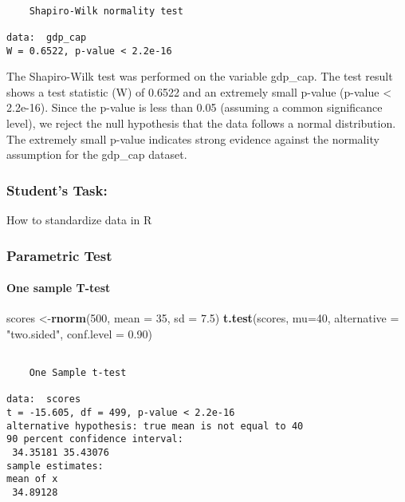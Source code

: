 \documentclass[
]{article}
\newenvironment{Shaded}{\begin{snugshade}}{\end{snugshade}}
\newcommand{\AttributeTok}[1]{\textcolor[rgb]{0.13,0.29,0.53}{#1}}
\newcommand{\DecValTok}[1]{\textcolor[rgb]{0.00,0.00,0.81}{#1}}
\newcommand{\FloatTok}[1]{\textcolor[rgb]{0.00,0.00,0.81}{#1}}
\newcommand{\FunctionTok}[1]{\textcolor[rgb]{0.13,0.29,0.53}{\textbf{#1}}}
\newcommand{\NormalTok}[1]{#1}
\newcommand{\OtherTok}[1]{\textcolor[rgb]{0.56,0.35,0.01}{#1}}
\newcommand{\StringTok}[1]{\textcolor[rgb]{0.31,0.60,0.02}{#1}}
\begin{document}
\begin{verbatim}

    Shapiro-Wilk normality test

data:  gdp_cap
W = 0.6522, p-value < 2.2e-16
\end{verbatim}

The Shapiro-Wilk test was performed on the variable gdp\_cap. The test
result shows a test statistic (W) of 0.6522 and an extremely small
p-value (p-value \textless{} 2.2e-16). Since the p-value is less than
0.05 (assuming a common significance level), we reject the null
hypothesis that the data follows a normal distribution. The extremely
small p-value indicates strong evidence against the normality assumption
for the gdp\_cap dataset.

\hypertarget{students-task}{%
\subsubsection{Student's Task:}\label{students-task}}

How to standardize data in R

\hypertarget{parametric-test}{%
\subsubsection{Parametric Test}\label{parametric-test}}

\hypertarget{one-sample-t-test}{%
\paragraph{One sample T-test}\label{one-sample-t-test}}

\begin{Shaded}
\begin{Highlighting}[]
\NormalTok{scores }\OtherTok{\textless{}{-}}\FunctionTok{rnorm}\NormalTok{(}\DecValTok{500}\NormalTok{, }\AttributeTok{mean =} \DecValTok{35}\NormalTok{, }\AttributeTok{sd =} \FloatTok{7.5}\NormalTok{)}
\FunctionTok{t.test}\NormalTok{(scores, }\AttributeTok{mu=}\DecValTok{40}\NormalTok{, }\AttributeTok{alternative =} \StringTok{"two.sided"}\NormalTok{, }\AttributeTok{conf.level =} \FloatTok{0.90}\NormalTok{)}
\end{Highlighting}
\end{Shaded}

\begin{verbatim}

    One Sample t-test

data:  scores
t = -15.605, df = 499, p-value < 2.2e-16
alternative hypothesis: true mean is not equal to 40
90 percent confidence interval:
 34.35181 35.43076
sample estimates:
mean of x 
 34.89128 
\end{verbatim}
\end{document}

